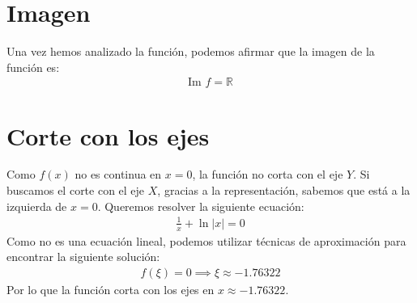 \documentclass{article}
\begin{document}
\section{Imagen}
Una vez hemos analizado la función, podemos afirmar que la imagen de la función es:
\begin{equation}
	\begin{split}
		\text{Im }f= \mathbb{R}
	\end{split}
\end{equation}
\section{Corte con los ejes}
Como $f(x)$ no es continua en $x=0$, la función no corta con el eje $Y$. Si buscamos el corte con el eje $X$, gracias a la representación, sabemos que está a la izquierda de $x=0$. Queremos resolver la siguiente ecuación:
\begin{equation}
	\begin{split}
		\frac{1}{x}+\ln |x|=0
	\end{split}
\end{equation}
Como no es una ecuación lineal, podemos utilizar técnicas de aproximación para encontrar la siguiente solución:
\begin{equation}
	\begin{split}
		f(\xi)=0 \implies \xi \approx -1.76322
	\end{split}
\end{equation}
Por lo que la función corta con los ejes en $x\approx -1.76322$. 
\end{document}
